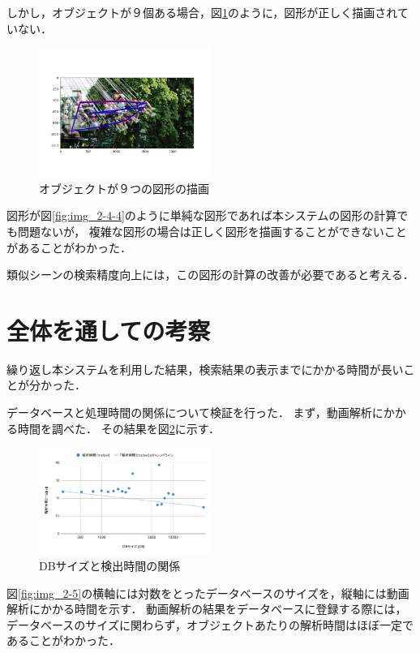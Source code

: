 \documentclass[a4j,12pt,dvipdfmx]{jreport}
\begin{document}
しかし，オブジェクトが９個ある場合，図\ref{fig:img_2_4_5}のように，図形が正しく描画されていない．
\begin{figure}[H]
  \centering
  \includegraphics[width=0.5\textwidth]{image/result_2_4_5.png}
  \caption{オブジェクトが９つの図形の描画}
  \label{fig:img_2_4_5}
\end{figure}

図形が図\ref{fig:img_2-4-4}のように単純な図形であれば本システムの図形の計算でも問題ないが，
複雑な図形の場合は正しく図形を描画することができないことがあることがわかった．

類似シーンの検索精度向上には，この図形の計算の改善が必要であると考える．

\section{全体を通しての考察}

繰り返し本システムを利用した結果，検索結果の表示までにかかる時間が長いことが分かった．

データベースと処理時間の関係について検証を行った．
まず，動画解析にかかる時間を調べた．
その結果を図\ref{fig:img_2_5}に示す．
\begin{figure}[H]
  \centering
  \includegraphics[width=0.5\textwidth]{image/result_2_5.png}
  \caption{DBサイズと検出時間の関係}
  \label{fig:img_2_5}
\end{figure}

図\ref{fig:img_2-5}の横軸には対数をとったデータベースのサイズを，縦軸には動画解析にかかる時間を示す．
動画解析の結果をデータベースに登録する際には，データベースのサイズに関わらず，オブジェクトあたりの解析時間はほぼ一定であることがわかった．
\end{document}
